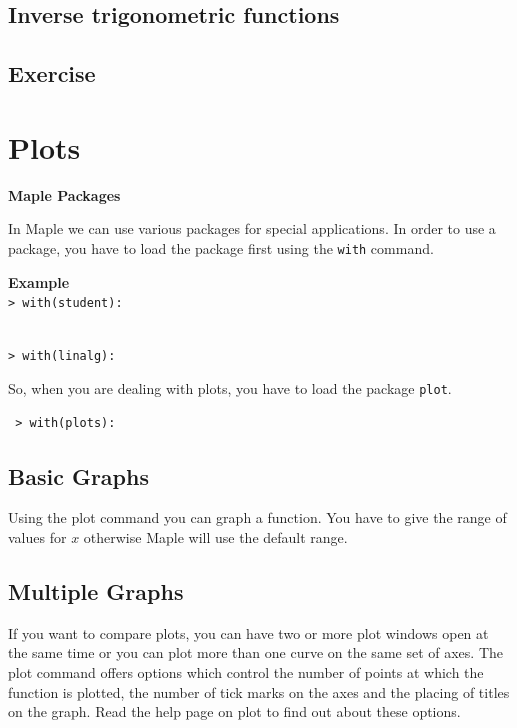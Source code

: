 \documentclass[
]{book}
\theoremstyle{definition}
\theoremstyle{definition}
\theoremstyle{definition}
\theoremstyle{definition}
\theoremstyle{remark}
\begin{document}
\section{Inverse trigonometric functions}\label{inverse-trigonometric-functions}

\section{Exercise}\label{exercise-11}

\chapter{Plots}\label{plots}

\textbf{Maple Packages}

In Maple we can use various packages for special applications. In order to use a package, you have to load the package first using the \texttt{with} command.

\textbf{Example}\\
\texttt{\textgreater{}\ with(student):}\strut \\
\texttt{\textgreater{}\ with(linalg):}

So, when you are dealing with plots, you have to load the package \texttt{plot}.

\begin{verbatim}
 > with(plots):
\end{verbatim}

\section{Basic Graphs}\label{basic-graphs}

Using the plot command you can graph a function. You have to give the range of values for \(x\) otherwise Maple will use the default range.

\section{Multiple Graphs}\label{multiple-graphs}

If you want to compare plots, you can have two or more plot windows open at the same time or you can plot more than one curve on the same set of axes. The plot command offers options which control the number of points at which the function is plotted, the number of
tick marks on the axes and the placing of titles on the graph. Read the help page on plot to find out about these options.
\end{document}
